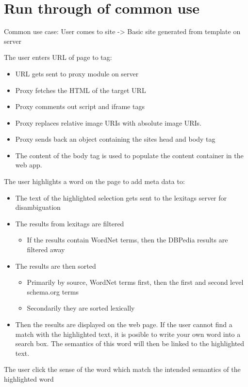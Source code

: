 \section{Run through of common use}
Common use case:
User comes to site -> Basic site generated from template on server

The user enters URL of page to tag:
\begin{itemize}
	\item URL gets sent to proxy module on server
	\item Proxy fetches the HTML of the target URL
	\item Proxy comments out script and iframe tags
	\item Proxy replaces relative image URIs with absolute image URIs.
	\item Proxy sends back an object containing the sites head and body tag
	\item The content of the body tag is used to populate the content container in the web app.
\end{itemize}
The user highlights a word on the page to add meta data to:
\begin{itemize}
	\item The text of the highlighted selection gets sent to the lexitags server for disambiguation
	\item The results from lexitags are filtered
	\begin{itemize}
		\item If the results contain WordNet terms, then the DBPedia results are filtered away
	\end{itemize}
	\item The results are then sorted
	\begin{itemize}
		\item Primarily by source, WordNet terms first, then the first and second level schema.org terms
		\item Secondarily they are sorted lexically
	\end{itemize}
	\item Then the results are displayed on the web page. If the user cannot find a match with the highlighted text,
	it is posible to write your own word into a search box.
	The semantics of this word will then be linked to the highlighted text.
\end{itemize}
The user click the sense of the word which match the intended semantics of the highlighted word
